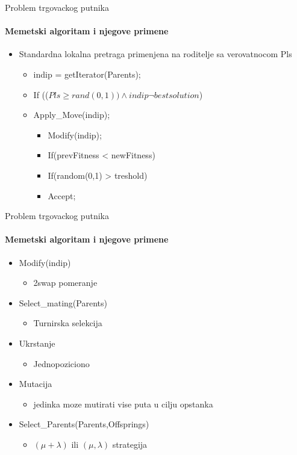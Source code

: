 \documentclass{beamer}
\begin{document}
\begin{frame}[fragile]{Problem trgovackog putnika}
  \framesubtitle{Memetski algoritam i njegove primene}
  
   \begin{itemize}
    \item{Standardna lokalna pretraga primenjena na roditelje sa verovatnocom Pls}
  \begin{itemize}
    \item{indip = getIterator(Parents);}
     
    \item{If (($Pls \geqslant	 rand(0,1)) \wedge indip \neg best solution$)}
    \item{Apply\_Move(indip);}
     \begin{itemize}
       \item{Modify(indip);}
        \item{If(prevFitness < newFitness)}
        \item{If(random(0,1) > treshold)}
        \item{Accept;}
        \end{itemize}
   \end{itemize}
  \end{itemize}

\end{frame}

\begin{frame}[fragile]{Problem trgovackog putnika}
  \framesubtitle{Memetski algoritam i njegove primene}

    \begin{itemize}
     \item{Modify(indip)}
       \begin{itemize}
     \item{2swap pomeranje}
     \end{itemize}
   
  
    \item{Select\_mating(Parents)}
     \begin{itemize}
     \item{Turnirska selekcija}
     \end{itemize}
       \item{Ukrstanje}
       \begin{itemize}
     \item{Jednopoziciono}
     \end{itemize}
     
     \item{Mutacija}
      \begin{itemize}
     \item{jedinka moze mutirati vise puta u cilju opstanka}
     \end{itemize}
   \item{Select\_Parents(Parents,Offsprings)}
      \begin{itemize}
     \item{$(\mu + \lambda)$ ili $(\mu,\lambda)$ strategija}
     \end{itemize}
  \end{itemize}

\end{frame}
\end{document}
